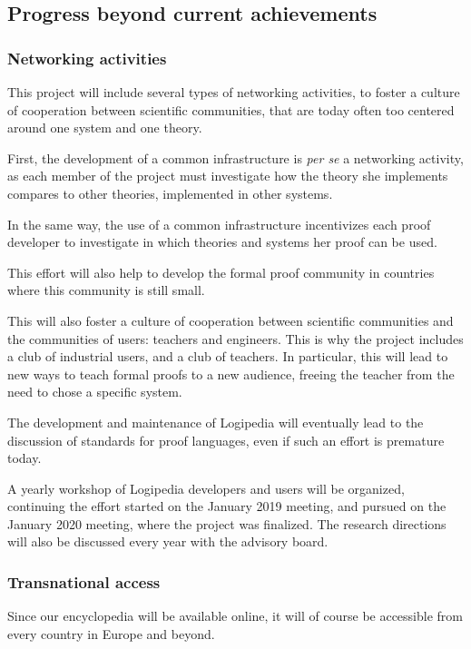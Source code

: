 \subsection{Progress beyond current achievements}

\subsubsection{Networking activities}
This project will include several types of networking activities, to
foster a culture of cooperation between scientific communities, that
are today often too centered around one system and one theory.

First, the development of a common infrastructure is \emph{per se} a
networking activity, as each member of the project must investigate
how the theory she implements compares to other theories, implemented
in other systems.

In the same way, the use of a common infrastructure incentivizes each
proof developer to investigate in which theories and systems her proof
can be used.

This effort will also help to develop the formal proof community in
countries where this community is still small.

This will also foster a culture of cooperation between scientific
communities and the communities of users: teachers and engineers.
This is why the project includes a club of industrial users, and
a club of teachers. In particular, this will lead to new ways to teach
formal proofs to a new audience, freeing the teacher from the need to
chose a specific system.

The development and maintenance of {\sc Logipedia} will eventually lead
to the discussion of standards for proof languages, even if such an
effort is premature today.

A yearly workshop of {\sc Logipedia} developers and users will be
organized, continuing the effort started on the January 2019 meeting,
and pursued on the January 2020 meeting, where the project was
finalized. The research directions will also be discussed
every year with the advisory board.

\subsubsection{Transnational access}

Since our encyclopedia will be available online, it will of course be
accessible from every country in Europe and beyond.

